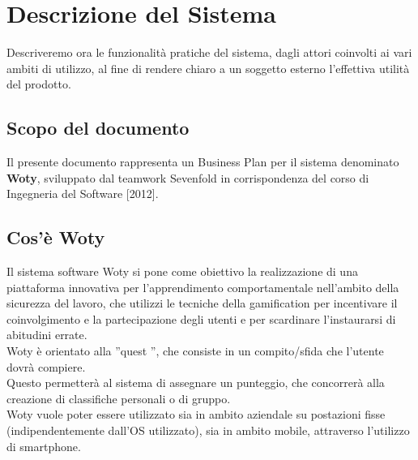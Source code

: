 \documentclass[10pt,a4paper]{article}
\begin{document}

\newpage

\tableofcontents %

\let\cleardoublepage\clearpage %

\listoftables

\listoffigures




\newpage


\section{Descrizione del Sistema}

Descriveremo ora le funzionalità pratiche del sistema, dagli attori coinvolti ai vari ambiti di utilizzo, al fine di rendere chiaro a un soggetto esterno l'effettiva utilità del prodotto.

\subsection{Scopo del documento}
Il presente documento rappresenta un Business Plan per il sistema denominato \textbf{Woty},  sviluppato dal teamwork Sevenfold in corrispondenza del corso di Ingegneria del Software [2012].\\

\subsection{Cos'è Woty}

Il sistema software Woty si pone come obiettivo la realizzazione di una piattaforma innovativa per l’apprendimento comportamentale nell’ambito della sicurezza del lavoro, che utilizzi le tecniche della gamification per incentivare il coinvolgimento e la partecipazione degli utenti e per scardinare l’instaurarsi di abitudini errate.\\
Woty è orientato alla ”quest ”, che consiste in un compito/sfida che l’utente dovrà compiere.\\
Questo permetterà al sistema di assegnare un punteggio, che concorrerà alla creazione di classifiche personali o di gruppo.\\
Woty vuole poter essere utilizzato sia in ambito aziendale su postazioni fisse (indipendentemente dall’OS utilizzato), sia in ambito mobile, attraverso l’utilizzo di smartphone.\\
\end{document}
